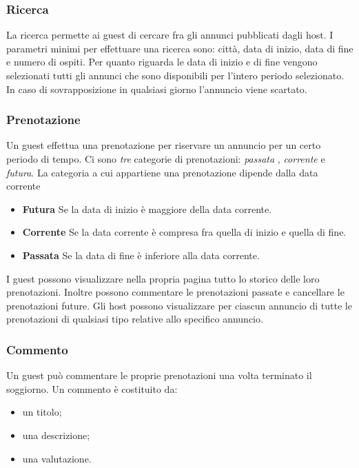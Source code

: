 \documentclass[1_relazione.tex]{subfiles}
\begin{document}
\subsubsection{Ricerca} 
La ricerca permette ai guest di cercare fra gli annunci pubblicati dagli host. I parametri minimi per effettuare una ricerca sono: citt\`{a}, data di inizio, data di fine e numero di ospiti. Per quanto riguarda le data di inizio e di fine vengono selezionati tutti gli annunci che sono disponibili per l'intero periodo selezionato. In caso di sovrapposizione in qualsiasi giorno l'annuncio viene scartato.

\subsubsection{Prenotazione} 
Un guest effettua una prenotazione per riservare un annuncio per un certo periodo di tempo. Ci sono \textit{tre} categorie di prenotazioni: \textit{passata} , \textit{corrente} e \textit{futura}.  La categoria a cui appartiene una prenotazione dipende dalla data corrente \\
\begin{itemize}
\item \textbf{Futura} Se la data di inizio \`{e} maggiore della data corrente.
\item \textbf{Corrente} Se la data corrente \`{e} compresa fra quella di inizio e quella di fine.
\item \textbf{Passata} Se la data di fine \`{e} inferiore alla data corrente.
\end{itemize}
I guest possono visualizzare nella propria pagina tutto lo storico delle loro prenotazioni. Inoltre possono commentare le prenotazioni passate e cancellare le prenotazioni future. 
Gli host possono visualizzare per ciascun annuncio di tutte le prenotazioni di qualsiasi tipo relative allo specifico annuncio.

\subsubsection{Commento} 
Un guest pu\`{o} commentare le proprie prenotazioni una volta terminato il soggiorno. Un commento \`{e} costituito da:
\begin{itemize}
 \item un titolo;
 \item una descrizione;
 \item una valutazione.
\end{itemize}
\end{document}
